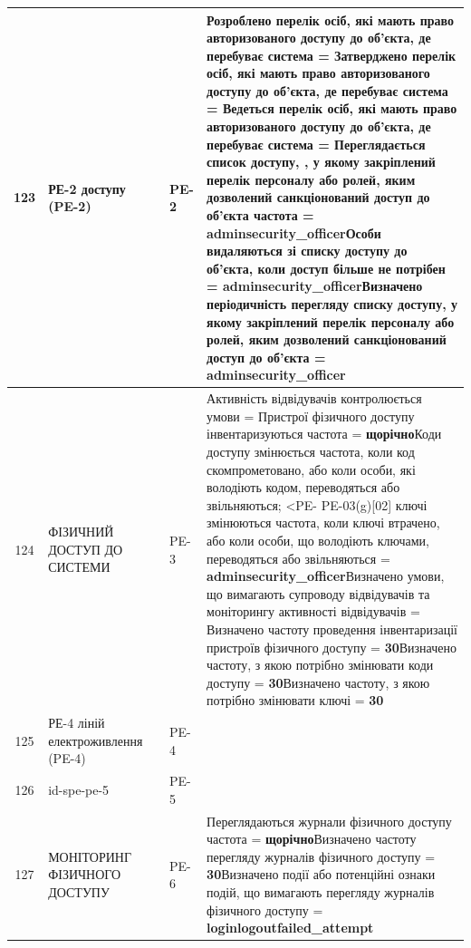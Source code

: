 \documentclass[10pt]{article}
\begin{document}
\begin{longtable}{|c|>{\raggedright\arraybackslash}p{4cm}|>{\raggedright\arraybackslash}p{2.5cm}|>{\raggedright\arraybackslash}p{3.5cm}|>{\raggedright\arraybackslash}p{5.5cm}|}
123 & РЕ-2 доступу (PE-2) &  & PE-2 & Розроблено перелік осіб, які мають право авторизованого доступу до об'єкта, де перебуває система = \textbf{}\newline Затверджено перелік осіб, які мають право авторизованого доступу до об'єкта, де перебуває система = \textbf{}\newline Ведеться перелік осіб, які мають право авторизованого доступу до об'єкта, де перебуває система = \textbf{}\newline Переглядається список доступу, , у якому закріплений перелік персоналу або ролей, яким дозволений санкціонований доступ до об'єкта частота = \textbf{adminsecurity\_\allowbreak{}officer}\newline Особи видаляються зі списку доступу до об'єкта, коли доступ більше не потрібен = \textbf{adminsecurity\_\allowbreak{}officer}\newline Визначено періодичність перегляду списку доступу, у якому закріплений перелік персоналу або ролей, яким дозволений санкціонований доступ до об'єкта = \textbf{adminsecurity\_\allowbreak{}officer} \\ \hline
124 & ФІЗИЧНИЙ ДОСТУП ДО СИСТЕМИ &  & PE-3 & Активність відвідувачів контролюється умови = \textbf{}\newline Пристрої фізичного доступу інвентаризуються частота = \textbf{щорічно}\newline Коди доступу змінюється частота, коли код скомпрометовано, або коли особи, які володіють кодом, переводяться або звільняються; <PE- PE-03(g)[02] ключі змінюються частота, коли ключі втрачено, або коли особи, що володіють ключами, переводяться або звільняються = \textbf{adminsecurity\_\allowbreak{}officer}\newline Визначено умови, що вимагають супроводу відвідувачів та моніторингу активності відвідувачів = \textbf{}\newline Визначено частоту проведення інвентаризації пристроїв фізичного доступу = \textbf{30}\newline Визначено частоту, з якою потрібно змінювати коди доступу = \textbf{30}\newline Визначено частоту, з якою потрібно змінювати ключі = \textbf{30} \\ \hline
125 & РЕ-4 ліній електроживлення (PE-4) &  & PE-4 &  \\ \hline
126 & id-spe-pe-5 &  & PE-5 &  \\ \hline
127 & МОНІТОРИНГ ФІЗИЧНОГО ДОСТУПУ &  & PE-6 & Переглядаються журнали фізичного доступу частота = \textbf{щорічно}\newline Визначено частоту перегляду журналів фізичного доступу = \textbf{30}\newline Визначено події або потенційні ознаки подій, що вимагають перегляду журналів фізичного доступу = \textbf{loginlogoutfailed\_\allowbreak{}attempt} \\ \hline

\end{longtable}
\end{document}
